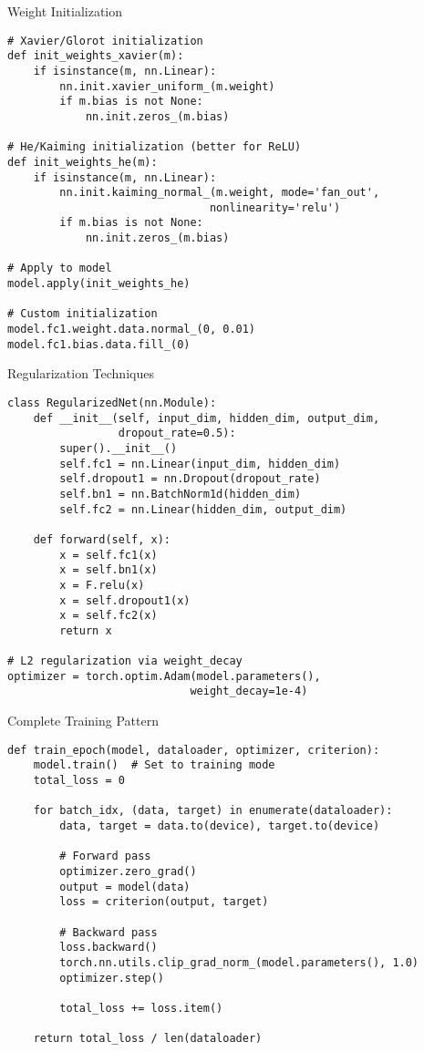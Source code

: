 \documentclass[aspectratio=169,10pt]{beamer}
\begin{document}
\begin{frame}[fragile]{Weight Initialization}
\begin{lstlisting}
# Xavier/Glorot initialization
def init_weights_xavier(m):
    if isinstance(m, nn.Linear):
        nn.init.xavier_uniform_(m.weight)
        if m.bias is not None:
            nn.init.zeros_(m.bias)

# He/Kaiming initialization (better for ReLU)
def init_weights_he(m):
    if isinstance(m, nn.Linear):
        nn.init.kaiming_normal_(m.weight, mode='fan_out',
                               nonlinearity='relu')
        if m.bias is not None:
            nn.init.zeros_(m.bias)

# Apply to model
model.apply(init_weights_he)

# Custom initialization
model.fc1.weight.data.normal_(0, 0.01)
model.fc1.bias.data.fill_(0)
\end{lstlisting}
\end{frame}

\begin{frame}[fragile]{Regularization Techniques}
\begin{lstlisting}
class RegularizedNet(nn.Module):
    def __init__(self, input_dim, hidden_dim, output_dim,
                 dropout_rate=0.5):
        super().__init__()
        self.fc1 = nn.Linear(input_dim, hidden_dim)
        self.dropout1 = nn.Dropout(dropout_rate)
        self.bn1 = nn.BatchNorm1d(hidden_dim)
        self.fc2 = nn.Linear(hidden_dim, output_dim)
        
    def forward(self, x):
        x = self.fc1(x)
        x = self.bn1(x)
        x = F.relu(x)
        x = self.dropout1(x)
        x = self.fc2(x)
        return x

# L2 regularization via weight_decay
optimizer = torch.optim.Adam(model.parameters(),
                            weight_decay=1e-4)
\end{lstlisting}
\end{frame}

\begin{frame}[fragile]{Complete Training Pattern}
\begin{lstlisting}
def train_epoch(model, dataloader, optimizer, criterion):
    model.train()  # Set to training mode
    total_loss = 0
    
    for batch_idx, (data, target) in enumerate(dataloader):
        data, target = data.to(device), target.to(device)
        
        # Forward pass
        optimizer.zero_grad()
        output = model(data)
        loss = criterion(output, target)
        
        # Backward pass
        loss.backward()
        torch.nn.utils.clip_grad_norm_(model.parameters(), 1.0)
        optimizer.step()
        
        total_loss += loss.item()
    
    return total_loss / len(dataloader)
\end{lstlisting}
\end{frame}
\end{document}
